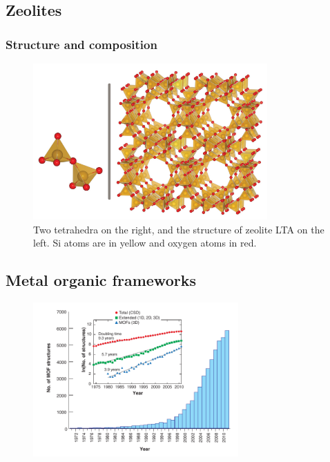 \documentclass[thesis]{subfiles}
\begin{document}
\subsection{Zeolites}
\subsubsection{Structure and composition}

\begin{figure}[ht]
    \centering
    \includegraphics[width=0.8\textwidth]{figures/images/zeolite-building-blocks}
    \caption{Two  tetrahedra on the right, and the structure of zeolite
    LTA on the left. Si atoms are in yellow and oxygen atoms in red.}
    \label{fig:zeolite-building-block}
\end{figure}

\subsection{Metal organic frameworks}

\begin{figure}[ht]
    \centering
    \includegraphics[width=0.7\textwidth]{figures/images/number-of-mofs}
    \caption{\TODO}
    \label{fig:number-of-mofs}
\end{figure}
\end{document}
